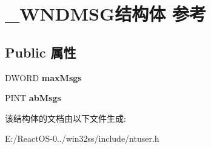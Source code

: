 \hypertarget{struct___w_n_d_m_s_g}{}\section{\+\_\+\+W\+N\+D\+M\+S\+G结构体 参考}
\label{struct___w_n_d_m_s_g}
\subsection*{Public 属性}
\begin{DoxyCompactItemize}
\item 
\mbox{\label{struct___w_n_d_m_s_g_afde6164c4087aab0aaeb0cc49917b5a5}} 
D\+W\+O\+RD {\bfseries max\+Msgs}
\item 
\mbox{\label{struct___w_n_d_m_s_g_ae6f97368b4406a034324b9e92b360e88}} 
P\+I\+NT {\bfseries ab\+Msgs}
\end{DoxyCompactItemize}


该结构体的文档由以下文件生成\+:\begin{DoxyCompactItemize}
\item 
E\+:/\+React\+O\+S-\/0../win32ss/include/ntuser.\+h\end{DoxyCompactItemize}
